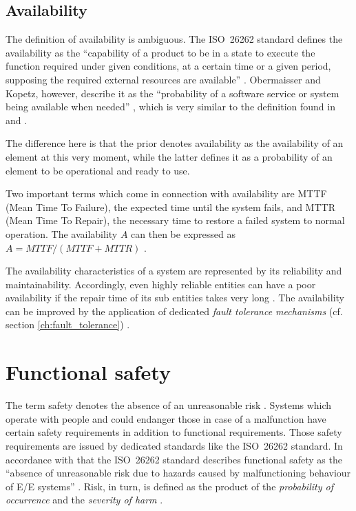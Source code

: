 \subsection{Availability}

\label{sec:availability}
The definition of availability is ambiguous. The \mbox{ISO 26262} standard defines the availability as the ``capability of a product to be in a state to execute the function required under given conditions, at a certain time or a given period, supposing the required external resources are available'' \cite{iso26262:1}. Obermaisser and Kopetz, however, describe it as the ``probability of a software service or system being available when needed'' \cite[p.116]{genesys}, which is very similar to the definition found in \cite{lessner} and \cite{nelson}.

The difference here is that the prior denotes availability as the availability of an element at this very moment, while the latter defines it as a probability of an element to be operational and ready to use.

Two important terms which come in connection with availability are MTTF (Mean Time To Failure), the expected time until the system fails, and MTTR (Mean Time To Repair), the necessary time to restore a failed system to normal operation. The availability $A$ can then be expressed as $A = MTTF/(MTTF + MTTR)$ \cite{nelson}. 

The availability characteristics of a system are represented by its reliability and maintainability. Accordingly, even highly reliable entities can have a poor availability if the repair time of its sub entities takes very long \cite{lessner}. The availability can be improved by the application of dedicated \emph{fault tolerance mechanisms} (cf. section \ref{ch:fault_tolerance}) \cite{nelson}.















\section{Functional safety}
\label{ch:functional_safety}

The term safety denotes the absence of an unreasonable risk \cite{iso26262:1}. Systems which operate with people and could endanger those in case of a malfunction have certain safety requirements in addition to functional requirements. Those safety requirements are issued by dedicated standards like the \mbox{ISO 26262} standard. In accordance with that the \mbox{ISO 26262} standard describes functional safety as the ``absence of unreasonable risk due to hazards caused by malfunctioning behaviour of E/E systems'' \cite{iso26262:1}. Risk, in turn, is defined as the product of the \emph{probability of occurrence} and the \emph{severity of harm} \cite{iso26262:1}.

